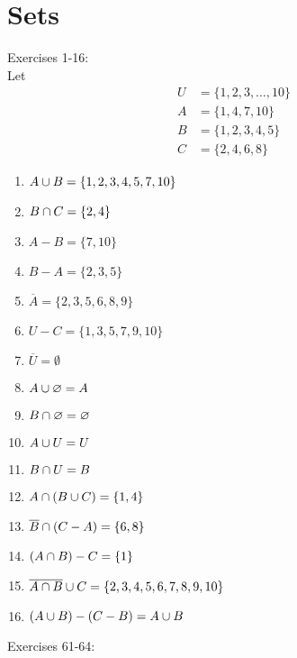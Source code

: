 \section*{Sets}


Exercises 1-16:\\

Let 
\begin{align*}
    U &= \{1, 2, 3, \dots, 10\}\\
    A &= \{1, 4, 7, 10\}\\
    B &= \{1, 2, 3, 4, 5\}\\
    C &= \{2, 4, 6, 8\}
\end{align*}

\begin{multicols}{2}
    \begin{enumerate}
        \item $A \cup B = \{1, 2, 3, 4, 5, 7, 10\}$
        \item $B \cap C = \{2, 4\}$
        \item $A - B = \{7, 10\}$
        \item $B - A = \{2, 3, 5\}$
        \item $\overline{A} = \{2, 3, 5, 6, 8, 9\}$
        \item $U - C = \{1, 3, 5, 7, 9, 10\}$
        \item $\overline{U} = \emptyset$
        \item $A \cup \varnothing = A$
        \item $B \cap \varnothing = \varnothing$
        \item $A \cup U = U$
        \item $B \cap U = B$
        \item $A \cap (B \cup C) = \{1, 4\}$
        \item $\overline{B} \cap (C - A) = \{6, 8\}$
        \item $(A \cap B) - C = \{1\}$
        \item $\overline{A \cap B} \cup C = \{2, 3, 4, 5, 6, 7, 8, 9, 10\}$
        \item $(A \cup B) - (C - B) = A \cup B$
    \end{enumerate}
\end{multicols}

\clearpage

Exercises 61-64:\\

